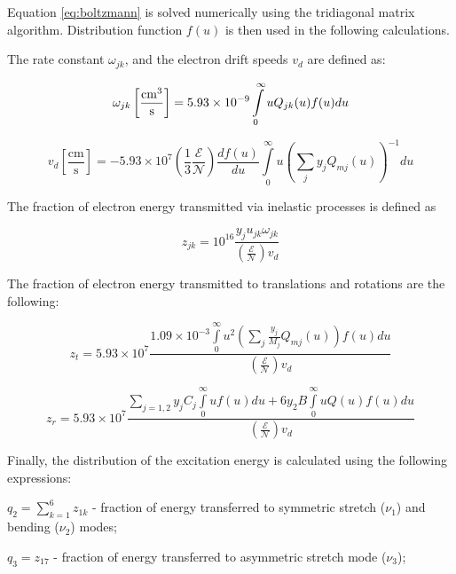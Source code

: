 \documentclass{report}
\begin{document}
Equation \ref{eq:boltzmann} is solved numerically using the tridiagonal matrix algorithm. Distribution function $f(u)$ is then used in the following calculations.

The rate constant $\omega_{jk}$, and the electron drift speeds $v_d$ are defined as:

\begin{equation}\label{eq:omega_jk}
\omega _{jk}\left[\frac{\rm{cm}^3}{\text{s}} \right] = 5.93 \times 10^{-9}\int\limits_0^\infty u Q_{jk}(u)f(u)du
\end{equation}
     
\begin{equation}\label{eq:v_d}
v_d \left[ \frac{\text{cm}}{\text{s}} \right] =  - 5.93 \times 10^7 \left( \frac{1}{3}\frac{\mathcal{E}}{\mathcal{N}} \right)\frac{df(u)}{du} \int\limits_0^\infty u \left( \sum\limits_j y_j Q_{mj}(u) \right)^{-1} du
\end{equation}

The fraction of electron energy transmitted via inelastic processes is defined as

\begin{equation}\label{eq:z_jk}
z_{jk} = 10^{16} \frac{y_j u_{jk} \omega _{jk}} {\left( \frac{\mathcal{E}}{\mathcal{N}} \right) v_d}   
\end{equation}

The fraction of electron energy transmitted to translations and rotations are the following:

\begin{equation}\label{eq:z_t}
z_t = 5.93 \times 10^7 \frac{1.09 \times 10^{-3} \int\limits_0^\infty u^2 \left( \sum\limits_j \frac{y_j}{M_j} Q_{mj}(u) \right)f(u)du} {\left( \frac{\mathcal{E}}{\mathcal{N}} \right) v_d}
\end{equation}

\begin{equation}\label{eq:z_r}
z_r = 5.93 \times 10^7 \frac{\sum\limits_{j=1,2} y_j C_j \int\limits_0^\infty uf(u)du + 6 y_2 B \int\limits_0^\infty u Q(u) f(u) du} {\left( \frac{\mathcal{E}}{\mathcal{N}} \right) v_d} 
\end{equation}

Finally, the distribution of the excitation energy is calculated using the following expressions:

$q_2 = \sum\limits_{k=1}^6 z_{1k}$ - fraction of energy transferred to  symmetric stretch ($\nu_1$) and bending ($\nu_2$) modes;

$q_3 = z_{17}$ - fraction of energy transferred to  asymmetric stretch mode ($\nu_3$);
\end{document}
